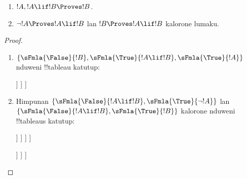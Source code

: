 \documentclass[../../../include/open-logic-section]{subfiles}
\begin{document}
\begin{prop}
  \begin{enumerate}
  \item {} $!A, !A \lif !B \Proves !B$.
  \item {}
    $\lnot !A \Proves !A \lif !B$ lan $!B \Proves !A \lif !B$
    kalorone lumaku.
  \end{enumerate}
\end{prop}

\begin{proof}
  \begin{enumerate}
    \item $\{\sFmla{\False}{!B}, \sFmla{\True}{!A \lif !B},
      \sFmla{\True}{!A}\}$ nduweni !!{tableau} katutup:
      \begin{oltableau}
        [\sFmla{\False}{\formula{B}}, just=\TAss
          [\sFmla{\True}{\formula{A} \lif \formula{B}}, just=\TAss
            [\sFmla{\True}{\formula{A}}, just=\TAss
              [\sFmla{\False}{\formula{A}}, just = {\TRule{\True}{\lif}[2]}, close]
              [\sFmla{\True}{\formula{B}}, just = {\TRule{\True}{\lif}[2]}, close]
            ]
          ]
        ]
      \end{oltableau}
    \item Himpunan $\{\sFmla{\False}{!A \lif !B},
      \sFmla{\True}{\lnot !A}\}$ lan $\{\sFmla{\False}{!A \lif !B},
      \sFmla{\True}{!B}\}$ kalorone nduweni !!{tableau}s katutup:
      \begin{oltableau}
        [\sFmla{\False}{\formula{A} \lif \formula{B}}, just = \TAss
          [\sFmla{\True}{\lnot \formula{A}}, just = \TAss
            [\sFmla{\True}{\formula{A}}, just = {\TRule{\False}{\lif}[1]}
              [\sFmla{\False}{\formula{B}}, just = {\TRule{\False}{\lif}[1]}
                [\sFmla{\False}{\formula{A}}, just = {\TRule{\True}{\lnot}[2]}, close]
              ]
            ]
          ]
        ]
      \end{oltableau}
      \begin{oltableau}
        [\sFmla{\False}{\formula{A} \lif \formula{B}}, just = \TAss
          [\sFmla{\True}{\formula{B}}, just = \TAss
            [\sFmla{\True}{\formula{A}}, just = {\TRule{\False}{\lif}[1]}
              [\sFmla{\False}{\formula{B}}, just = {\TRule{\False}{\lif}[1]},close
              ]
            ]
          ]
        ]
      \end{oltableau}
  \end{enumerate}
\end{proof}
\end{document}

